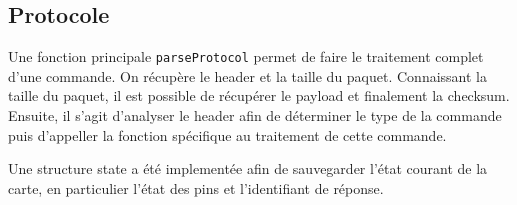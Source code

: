 \subsection{Protocole}

Une fonction principale \texttt{parseProtocol} permet de faire le traitement complet d'une commande.
On récupère le header et la taille du paquet.
Connaissant la taille du paquet, il est possible de récupérer le payload et finalement la checksum.
Ensuite, il s'agit d'analyser le header afin de déterminer le type de la commande puis d'appeller la fonction spécifique au traitement de cette commande.

Une structure state a été implementée afin de sauvegarder l'état courant de la carte, en particulier l'état des pins et l'identifiant de réponse.


